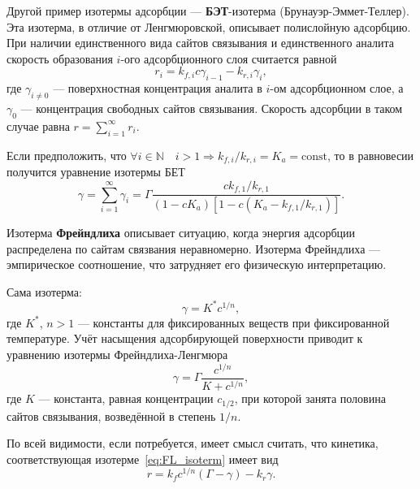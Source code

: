\documentclass[oneside,final,12pt]{extreport}
\begin{document}

Другой пример изотермы адсорбции ---
\textbf{БЭТ}-изотерма (Брунауэр-Эммет-Теллер).
Эта изотерма, в отличие от Ленгмюровской, описывает полислойную адсорбцию.
При наличии единственного вида сайтов связывания и единственного аналита
скорость образования $i$-ого адсорбционного слоя считается равной
\begin{equation}
  r_i = k_{f,i} c \gamma_{i-1} - k_{r,i} \gamma_{i},
\label{eq:BET_ith_layer_deriv}
\end{equation}
где $\gamma_{i \neq 0}$ --- поверхностная концентрация аналита в
$i$-ом адсорбционном слое, а
$\gamma_0$ --- концентрация свободных сайтов связывания.
Скорость адсорбции в таком случае равна $r = \sum_{i=1}^{\infty} r_i$.

Если предположить, что
$\forall i \in \mathbb{N} \quad i > 1 \Rightarrow
k_{f,i}/k_{r,i} = K_a = \text{const}$,
то в равновесии получится уравнение изотермы БЕТ
\begin{equation}
  \gamma = \sum_{i=1}^{\infty}\gamma_i =
    \Gamma\frac{ck_{f,1}/k_{r,1}}
               {\left(1 - cK_a\right)
                \left[1 - c\left(K_a - k_{f,1}/k_{r,1}\right)\right]}.
\label{eq:BET_isotherm}
\end{equation}

Изотерма \textbf{Фрейндлиха} описывает ситуацию,
когда энергия адсорбции распределена по сайтам связвания неравномерно.
Изотерма Фрейндлиха --- эмпирическое соотношение,
что затрудняет его физическую интерпретацию.

Сама изотерма:
\begin{equation}
  \gamma = K^*c^{1/n},
\label{eq:pure_Freundlich_isoterm}
\end{equation}
где $K^*$, $n>1$ --- константы для фиксированных веществ при фиксированной температуре.
Учёт насыщения адсорбирующей поверхности приводит к
уравнению изотермы Фрейндлиха-Ленгмюра
\begin{equation}
  \gamma = \Gamma\frac{c^{1/n}}{K + c^{1/n}},
\label{eq:FL_isoterm}
\end{equation}
где $K$ --- константа, равная концентрации $c_{1/2}$,
при которой занята половина сайтов связывания, возведённой в степень $1/n$.

По всей видимости,
если потребуется, имеет смысл считать, что
кинетика, соответствующая изотерме~\eqref{eq:FL_isoterm}
имеет вид\cite{bib:freundlich_kinetics}
\begin{equation}
  r = k_f c^{1/n} (\Gamma - \gamma) - k_r \gamma.
\label{eq:FL_kinetics}
\end{equation}
\end{document}
